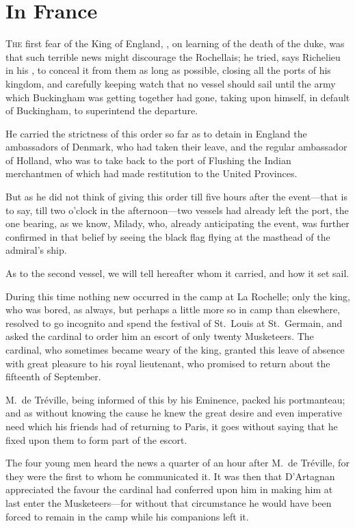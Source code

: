 
\chapter{In France}

\lettrine{T}{he} first fear of the King of England, , on learning of the death of the duke, was that such terrible news might discourage the Rochellais; he tried, says Richelieu in his , to conceal it from them as long as possible, closing all the ports of his kingdom, and carefully keeping watch that no vessel should sail until the army which Buckingham was getting together had gone, taking upon himself, in default of Buckingham, to superintend the departure. 

He carried the strictness of this order so far as to detain in England the ambassadors of Denmark, who had taken their leave, and the regular ambassador of Holland, who was to take back to the port of Flushing the Indian merchantmen of which  had made restitution to the United Provinces. 

But as he did not think of giving this order till five hours after the event—that is to say, till two o'clock in the afternoon—two vessels had already left the port, the one bearing, as we know, Milady, who, already anticipating the event, was further confirmed in that belief by seeing the black flag flying at the masthead of the admiral's ship. 

As to the second vessel, we will tell hereafter whom it carried, and how it set sail. 

During this time nothing new occurred in the camp at La Rochelle; only the king, who was bored, as always, but perhaps a little more so in camp than elsewhere, resolved to go incognito and spend the festival of St.~Louis at St.~Germain, and asked the cardinal to order him an escort of only twenty Musketeers. The cardinal, who sometimes became weary of the king, granted this leave of absence with great pleasure to his royal lieutenant, who promised to return about the fifteenth of September. 

M.~de Tréville, being informed of this by his Eminence, packed his portmanteau; and as without knowing the cause he knew the great desire and even imperative need which his friends had of returning to Paris, it goes without saying that he fixed upon them to form part of the escort. 

The four young men heard the news a quarter of an hour after M.~de Tréville, for they were the first to whom he communicated it. It was then that D'Artagnan appreciated the favour the cardinal had conferred upon him in making him at last enter the Musketeers—for without that circumstance he would have been forced to remain in the camp while his companions left it. 

